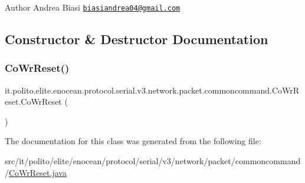 \begin{DoxyAuthor}{Author}
Andrea Biasi \href{mailto:biasiandrea04@gmail.com}{\tt biasiandrea04@gmail.\+com} 
\end{DoxyAuthor}


\subsection{Constructor \& Destructor Documentation}
\hypertarget{classit_1_1polito_1_1elite_1_1enocean_1_1protocol_1_1serial_1_1v3_1_1network_1_1packet_1_1commoncommand_1_1_co_wr_reset_ac4dff7923df2640a5ea6d40e88bc3883}{}\label{classit_1_1polito_1_1elite_1_1enocean_1_1protocol_1_1serial_1_1v3_1_1network_1_1packet_1_1commoncommand_1_1_co_wr_reset_ac4dff7923df2640a5ea6d40e88bc3883} 
\subsubsection{\texorpdfstring{Co\+Wr\+Reset()}{CoWrReset()}}
{\footnotesize\ttfamily it.\+polito.\+elite.\+enocean.\+protocol.\+serial.\+v3.\+network.\+packet.\+commoncommand.\+Co\+Wr\+Reset.\+Co\+Wr\+Reset (\begin{DoxyParamCaption}{ }\end{DoxyParamCaption})}



The documentation for this class was generated from the following file\+:\begin{DoxyCompactItemize}
\item 
src/it/polito/elite/enocean/protocol/serial/v3/network/packet/commoncommand/\hyperlink{_co_wr_reset_8java}{Co\+Wr\+Reset.\+java}\end{DoxyCompactItemize}
